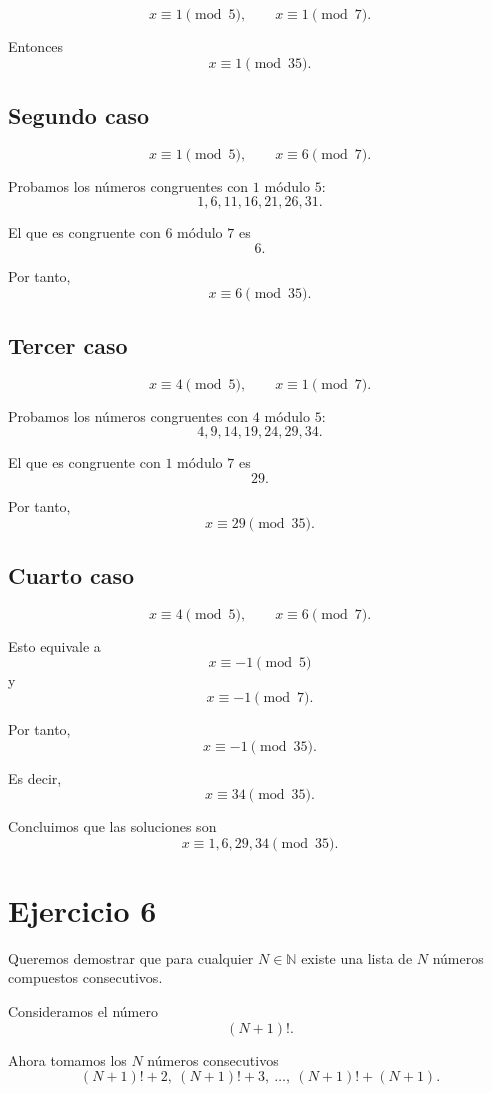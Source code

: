 \documentclass[12pt]{article}
\begin{document}
\[
x\equiv 1\pmod 5,
\qquad
x\equiv 1\pmod 7.
\]

Entonces
\[
x\equiv 1\pmod {35}.
\]

\subsection*{Segundo caso}

\[
x\equiv 1\pmod 5,
\qquad
x\equiv 6\pmod 7.
\]

Probamos los números congruentes con \(1\) módulo \(5\):
\[
1,6,11,16,21,26,31.
\]

El que es congruente con \(6\) módulo \(7\) es
\[
6.
\]

Por tanto,
\[
x\equiv 6\pmod {35}.
\]

\subsection*{Tercer caso}

\[
x\equiv 4\pmod 5,
\qquad
x\equiv 1\pmod 7.
\]

Probamos los números congruentes con \(4\) módulo \(5\):
\[
4,9,14,19,24,29,34.
\]

El que es congruente con \(1\) módulo \(7\) es
\[
29.
\]

Por tanto,
\[
x\equiv 29\pmod {35}.
\]

\subsection*{Cuarto caso}

\[
x\equiv 4\pmod 5,
\qquad
x\equiv 6\pmod 7.
\]

Esto equivale a
\[
x\equiv -1\pmod 5
\]
y
\[
x\equiv -1\pmod 7.
\]

Por tanto,
\[
x\equiv -1\pmod {35}.
\]

Es decir,
\[
x\equiv 34\pmod {35}.
\]

Concluimos que las soluciones son
\[
\boxed{x\equiv 1,6,29,34\pmod {35}}.
\]

\section*{Ejercicio 6}

Queremos demostrar que para cualquier \(N\in\mathbb{N}\) existe una lista de \(N\) números compuestos consecutivos.

Consideramos el número
\[
(N+1)!.
\]

Ahora tomamos los \(N\) números consecutivos
\[
(N+1)!+2,\ (N+1)!+3,\ \dots,\ (N+1)!+(N+1).
\]
\end{document}
